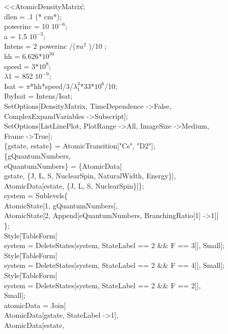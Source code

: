\textless\textless AtomicDensityMatrix\`;\\
dlen = .1 (* cm*);\\
powerinc = 10 $10^{-6}$;\\
a = 1.5 $10^{-3}$;\\
Intens = 2 powerinc /($\pi a^2$ )/10 ;\\
hh = 6.626*$10^{34}$\\
speed = 3*$10^{8}$;\\
$\lambda$1 = 852 $10^{-9}$;\\
Isat = $\pi$*hh*speed/3/$\lambda_1^3$*33*$10^{6}$/10;\\
IbyIsat = Intens/Isat;\\
SetOptions[DensityMatrix, TimeDependence -\textgreater False, \\
  ComplexExpandVariables -\textgreater Subscript];\\
SetOptions[ListLinePlot, PlotRange -\textgreater All, ImageSize -\textgreater Medium, \\
  Frame -\textgreater True];\\
\{gstate, estate\} = AtomicTransition["Cs", "D2"];\\
\{gQuantumNumbers, \\
   eQuantumNumbers\} = \{AtomicData[\\
    gstate, \{J, L, S, NuclearSpin, NaturalWidth, Energy\}],\\
   AtomicData[estate, \{J, L, S, NuclearSpin\}]\};\\
system = Sublevels\@\{\\
    AtomicState[1, gQuantumNumbers], \\
    AtomicState[2, Append[eQuantumNumbers, BranchingRatio[1] -\textgreater 1]]\\
    \};\\
Style[TableForm[\\
   system = DeleteStates[system, StateLabel == 2 \&\& F == 3]], Small];\\
Style[TableForm[\\
   system = DeleteStates[system, StateLabel == 2 \&\& F == 4]], Small];\\
Style[TableForm[\\
   system = DeleteStates[system, StateLabel == 2 \&\& F == 2]],\\
  Small];\\
atomicData = Join[\\
   AtomicData[gstate, StateLabel -\textgreater 1],\\
   AtomicData[estate, \\

